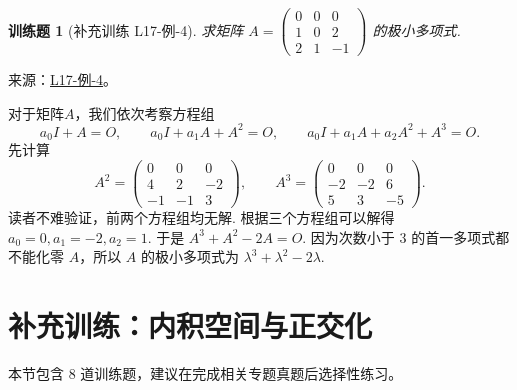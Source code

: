 \documentclass[UTF8,12pt,a4paper,fontset=fandol]{ctexart}
\newtheorem{exercise}{训练题}[section]
\begin{document}
\begin{exercise}[补充训练 L17-例-4]\label{prob:L17-例-4}
求矩阵 $A = \begin{pmatrix}
            0 & 0 & 0 \\ 1 & 0 & 2 \\ 2 & 1 & -1
        \end{pmatrix}$ 的极小多项式.
\end{exercise}
\noindent 来源：\href{https://github.com/yhwu-is/Linear-Algebra-Left-Undone/blob/new/%E8%AE%B2%E4%B9%89/%E4%B8%93%E9%A2%98/17%20%E5%A4%9A%E9%A1%B9%E5%BC%8F%E7%9A%84%E8%BF%9B%E4%B8%80%E6%AD%A5%E8%AE%A8%E8%AE%BA.tex}{L17-例-4}。
\begin{solve}
对于矩阵$A$，我们依次考察方程组
    \[
        a_0I+A=O,\qquad a_0I+a_1A+A^2=O,\qquad a_0I+a_1A+a_2A^2+A^3=O.
    \]
    先计算
    \[
        A^2=\begin{pmatrix}
                0 & 0  & 0  \\
                4 & 2  & -2 \\
                -1 & -1 & 3
            \end{pmatrix},
        \qquad
        A^3=\begin{pmatrix}
                0 & 0  & 0  \\
                -2 & -2 & 6  \\
                5 & 3  & -5
            \end{pmatrix}.
    \]
    读者不难验证，前两个方程组均无解. 根据三个方程组可以解得 $a_0 = 0, a_1 = -2, a_2 = 1$. 于是 $A^3 + A^2 - 2A=O$. 因为次数小于 $3$ 的首一多项式都不能化零 $A$，所以 $A$ 的极小多项式为 $\lambda^3+\lambda^2-2\lambda$.
\end{solve}

\section{补充训练：内积空间与正交化}

本节包含 8 道训练题，建议在完成相关专题真题后选择性练习。
\end{document}
